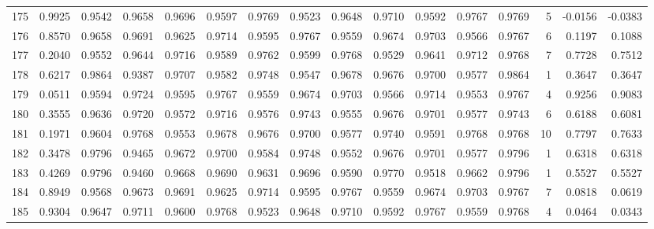 \begin{tabular}{lrrrrrrrrrrrrrrr}
175 &      0.9925 &  0.9542 &  0.9658 &  0.9696 &  0.9597 &  0.9769 &  0.9523 &  0.9648 &  0.9710 &  0.9592 &   0.9767 &     0.9769 &      5 &                   -0.0156 &                    -0.0383 \\
176 &      0.8570 &  0.9658 &  0.9691 &  0.9625 &  0.9714 &  0.9595 &  0.9767 &  0.9559 &  0.9674 &  0.9703 &   0.9566 &     0.9767 &      6 &                    0.1197 &                     0.1088 \\
177 &      0.2040 &  0.9552 &  0.9644 &  0.9716 &  0.9589 &  0.9762 &  0.9599 &  0.9768 &  0.9529 &  0.9641 &   0.9712 &     0.9768 &      7 &                    0.7728 &                     0.7512 \\
178 &      0.6217 &  0.9864 &  0.9387 &  0.9707 &  0.9582 &  0.9748 &  0.9547 &  0.9678 &  0.9676 &  0.9700 &   0.9577 &     0.9864 &      1 &                    0.3647 &                     0.3647 \\
179 &      0.0511 &  0.9594 &  0.9724 &  0.9595 &  0.9767 &  0.9559 &  0.9674 &  0.9703 &  0.9566 &  0.9714 &   0.9553 &     0.9767 &      4 &                    0.9256 &                     0.9083 \\
180 &      0.3555 &  0.9636 &  0.9720 &  0.9572 &  0.9716 &  0.9576 &  0.9743 &  0.9555 &  0.9676 &  0.9701 &   0.9577 &     0.9743 &      6 &                    0.6188 &                     0.6081 \\
181 &      0.1971 &  0.9604 &  0.9768 &  0.9553 &  0.9678 &  0.9676 &  0.9700 &  0.9577 &  0.9740 &  0.9591 &   0.9768 &     0.9768 &     10 &                    0.7797 &                     0.7633 \\
182 &      0.3478 &  0.9796 &  0.9465 &  0.9672 &  0.9700 &  0.9584 &  0.9748 &  0.9552 &  0.9676 &  0.9701 &   0.9577 &     0.9796 &      1 &                    0.6318 &                     0.6318 \\
183 &      0.4269 &  0.9796 &  0.9460 &  0.9668 &  0.9690 &  0.9631 &  0.9696 &  0.9590 &  0.9770 &  0.9518 &   0.9662 &     0.9796 &      1 &                    0.5527 &                     0.5527 \\
184 &      0.8949 &  0.9568 &  0.9673 &  0.9691 &  0.9625 &  0.9714 &  0.9595 &  0.9767 &  0.9559 &  0.9674 &   0.9703 &     0.9767 &      7 &                    0.0818 &                     0.0619 \\
185 &      0.9304 &  0.9647 &  0.9711 &  0.9600 &  0.9768 &  0.9523 &  0.9648 &  0.9710 &  0.9592 &  0.9767 &   0.9559 &     0.9768 &      4 &                    0.0464 &                     0.0343 \\

\end{tabular}
